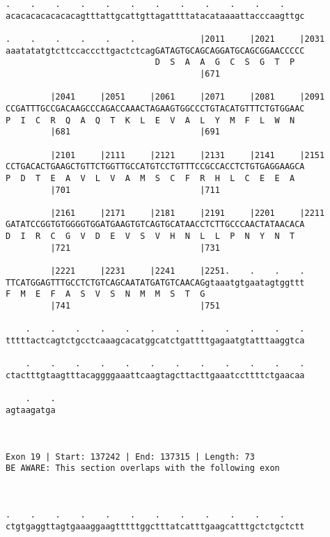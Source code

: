 \documentclass{article}
\begin{document}
\begin{Verbatim}
.    .    .    .    .    .    .    .    .    .    .    .    
acacacacacacacagtttattgcattgttagattttatacataaaattacccaagttgc
                                                            
.    .    .    .    .    .             |2011     |2021     |2031
aaatatatgtcttccacccttgactctcagGATAGTGCAGCAGGATGCAGCGGAACCCCC
                              D  S  A  A  G  C  S  G  T  P  
                                       |671                 
  
         |2041     |2051     |2061     |2071     |2081     |2091
CCGATTTGCCGACAAGCCCAGACCAAACTAGAAGTGGCCCTGTACATGTTTCTGTGGAAC
P  I  C  R  Q  A  Q  T  K  L  E  V  A  L  Y  M  F  L  W  N  
         |681                          |691                 
  
         |2101     |2111     |2121     |2131     |2141     |2151
CCTGACACTGAAGCTGTTCTGGTTGCCATGTCCTGTTTCCGCCACCTCTGTGAGGAAGCA
P  D  T  E  A  V  L  V  A  M  S  C  F  R  H  L  C  E  E  A  
         |701                          |711                 
  
         |2161     |2171     |2181     |2191     |2201     |2211
GATATCCGGTGTGGGGTGGATGAAGTGTCAGTGCATAACCTCTTGCCCAACTATAACACA
D  I  R  C  G  V  D  E  V  S  V  H  N  L  L  P  N  Y  N  T  
         |721                          |731                 
  
         |2221     |2231     |2241     |2251.    .    .    .
TTCATGGAGTTTGCCTCTGTCAGCAATATGATGTCAACAGgtaaatgtgaatagtggttt
F  M  E  F  A  S  V  S  N  M  M  S  T  G                    
         |741                          |751                 
  
    .    .    .    .    .    .    .    .    .    .    .    .
tttttactcagtctgcctcaaagcacatggcatctgattttgagaatgtatttaaggtca
                                                            
    .    .    .    .    .    .    .    .    .    .    .    .
ctactttgtaagtttacaggggaaattcaagtagcttacttgaaatccttttctgaacaa
                                                            
    .    .
agtaagatga
          
          
 
Exon 19 | Start: 137242 | End: 137315 | Length: 73
BE AWARE: This section overlaps with the following exon



.    .    .    .    .    .    .    .    .    .    .    .    
ctgtgaggttagtgaaaggaagtttttggctttatcatttgaagcatttgctctgctctt
                                                            

\end{Verbatim}
\end{document}
